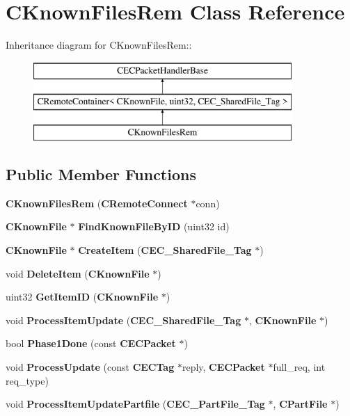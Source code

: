 \section{CKnownFilesRem Class Reference}
\label{classCKnownFilesRem}
Inheritance diagram for CKnownFilesRem::\begin{figure}[H]
\begin{center}
\leavevmode
\includegraphics[height=3cm]{classCKnownFilesRem}
\end{center}
\end{figure}
\subsection*{Public Member Functions}
\begin{DoxyCompactItemize}
\item 
{\bfseries CKnownFilesRem} ({\bf CRemoteConnect} $\ast$conn)\label{classCKnownFilesRem_a1b06230ceab38bd52fae07b22278914f}

\item 
{\bf CKnownFile} $\ast$ {\bfseries FindKnownFileByID} (uint32 id)\label{classCKnownFilesRem_a05215723a36ff065aa8464c1b142ac6f}

\item 
{\bf CKnownFile} $\ast$ {\bfseries CreateItem} ({\bf CEC\_\-SharedFile\_\-Tag} $\ast$)\label{classCKnownFilesRem_a3ea04ea09d28204fbe08eebeef72b3a0}

\item 
void {\bfseries DeleteItem} ({\bf CKnownFile} $\ast$)\label{classCKnownFilesRem_a32509ca42507b628f25d8ad44f05fa91}

\item 
uint32 {\bfseries GetItemID} ({\bf CKnownFile} $\ast$)\label{classCKnownFilesRem_aab62a9ca6653259d117ee8fec0463bcd}

\item 
void {\bfseries ProcessItemUpdate} ({\bf CEC\_\-SharedFile\_\-Tag} $\ast$, {\bf CKnownFile} $\ast$)\label{classCKnownFilesRem_abab6022f3afda0d4e2d490b7ca7517d6}

\item 
bool {\bfseries Phase1Done} (const {\bf CECPacket} $\ast$)\label{classCKnownFilesRem_a90aeb28abe0e583bb936928e78e007ae}

\item 
void {\bfseries ProcessUpdate} (const {\bf CECTag} $\ast$reply, {\bf CECPacket} $\ast$full\_\-req, int req\_\-type)\label{classCKnownFilesRem_a6826c9ebd84b412c71fe8afc8652e5d4}

\item 
void {\bfseries ProcessItemUpdatePartfile} ({\bf CEC\_\-PartFile\_\-Tag} $\ast$, {\bf CPartFile} $\ast$)\label{classCKnownFilesRem_a97e474e9f97687e73d8ef0b41929d5e2}

\end{DoxyCompactItemize}
